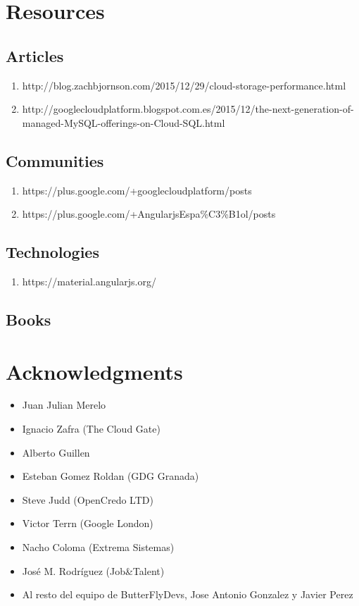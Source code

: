 \documentclass[oneside,english,titlepage]{scrbook}
\begin{document}
\chapter{Resources }

\section{Articles}
\begin{enumerate}
\item http://blog.zachbjornson.com/2015/12/29/cloud-storage-performance.html
\item http://googlecloudplatform.blogspot.com.es/2015/12/the-next-generation-of-managed-MySQL-offerings-on-Cloud-SQL.html
\end{enumerate}

\section{Communities}
\begin{enumerate}
\item https://plus.google.com/+googlecloudplatform/posts
\item https://plus.google.com/+AngularjsEspa\%C3\%B1ol/posts
\end{enumerate}

\section{Technologies}
\begin{enumerate}
\item https://material.angularjs.org/
\end{enumerate}

\section{Books}

\chapter{Acknowledgments}
\begin{itemize}
\item Juan Julian Merelo
\item Ignacio Zafra (The Cloud Gate)
\item Alberto Guillen
\item Esteban Gomez Roldan (GDG Granada)
\item Steve Judd (OpenCredo LTD)
\item Victor Terrn (Google London)
\item Nacho Coloma (Extrema Sistemas)
\item José M. Rodríguez (Job\&Talent)
\item Al resto del equipo de ButterFlyDevs, Jose Antonio Gonzalez y Javier
Perez
\end{itemize}

\nocite{*}

\end{document}
